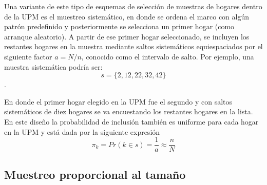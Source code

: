 Una variante de este tipo de esquemas de selección de muestras de hogares dentro de la UPM es el muestreo sistemático, en donde se ordena el marco con algún patrón predefinido y posteriormente se selecciona un primer hogar (como arranque aleatorio). A partir de ese primer hogar seleccionado, se incluyen los restantes hogares en la muestra mediante saltos sistemáticos equiespaciados por el siguiente factor \(a = N/n\), conocido como el intervalo de salto. Por ejemplo, una muestra sistemática podría ser:
\[s=\{2, 12, 22, 32, 42\}\].

En donde el primer hogar elegido en la UPM fue el segundo y con saltos sistemáticos de diez hogares se va encuestando los restantes hogares en la lista. En este diseño la probabilidad de inclusión también es uniforme para cada hogar en la UPM y está dada por la siguiente expresión
\[\pi_k = Pr(k \in s) = \frac{1}{a} \approx \frac{n}{N}\]

\hypertarget{muestreo-proporcional-al-tamano}{%
\subsection*{Muestreo proporcional al tamaño}\label{muestreo-proporcional-al-tamano}}


